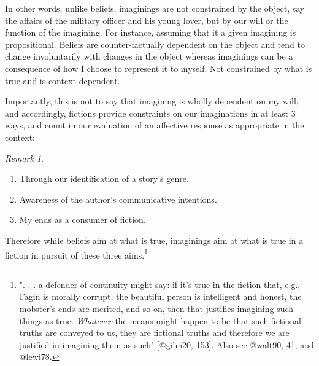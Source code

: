 \documentclass[
  letterpaper,
  DIV=11,
  numbers=noendperiod]{scrartcl}
\providecommand{\tightlist}{%
  \setlength{\itemsep}{0pt}\setlength{\parskip}{0pt}}
\theoremstyle{remark}
\newtheorem*{remark}{Remark}
\begin{document}
In other words, unlike beliefs, imaginings are not constrained by the
object, say the affairs of the military officer and his young lover, but
by our will or the function of the imagining. For instance, assuming
that it a given imagining is propositional. Beliefs are
counter-factually dependent on the object and tend to change
involuntarily with changes in the object whereas imaginings can be a
consequence of how I choose to represent it to myself. Not constrained
by what is true and is context dependent.

Importantly, this is not to say that imagining is wholly dependent on my
will, and accordingly, fictions provide constraints on our imaginations
in at least 3 ways, and count in our evaluation of an affective response
as appropriate in the context:

\begin{remark}
\leavevmode

\begin{enumerate}
\def\labelenumi{\arabic{enumi}.}
\tightlist
\item
  Through our identification of a story's genre.
\item
  Awareness of the author's communicative intentions.
\item
  My ends as a consumer of fiction.
\end{enumerate}

\end{remark}

\noindent Therefore while beliefs aim at what is true, imaginings aim at
what is true in a fiction in pursuit of these three aims.\footnote{". .
  . a defender of continuity might say: if it's true in the fiction
  that, e.g., Fagin is morally corrupt, the beautiful person is
  intelligent and honest, the mobster's ends are merited, and so on,
  then that justifies imagining such things as true. \emph{Whatever} the
  means might happen to be that such fictional truths are conveyed to
  us, they are fictional truths and therefore we are justified in
  imagining them as such" {[}@gilm20, 153{]}. Also see @walt90, 41; and
  @lewi78.}
\end{document}

